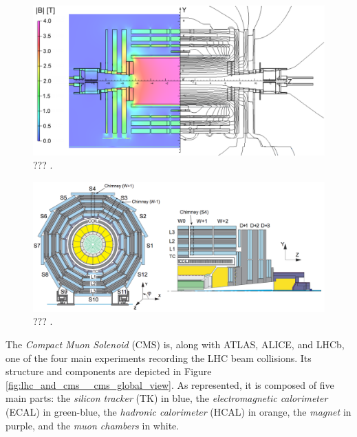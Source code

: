   \begin{figure}[h!]
    \centering
    \includegraphics[width=\textwidth]{img/I-3-cms/magnet.png}
    \caption{??? \cite{Chatrchyan:2009si}.}
    \label{fig:I-3-cms-magnet}
  \end{figure}

  \begin{figure}[h!]
    \centering
    \includegraphics[width=\textwidth]{img/I-3-cms/muon-numbering.png}
    \caption{??? \cite{Chatrchyan:2009si}.}
    \label{fig:I-3-cms-muon-numbering}
  \end{figure}
























\newcommand{\GeVc}{GeV c$ ^{-1} $}
\newcommand{\um}{$ \mu $m}
\newcommand{\us}{$ \mu $s}
\newcommand{\pT}{$ p_T $}
\newcommand{\pZ}{$ p_Z $}
\newcommand{\axis}[1]{#1}

		The \emph{Compact Muon Solenoid} (CMS) \Cite{CMS_at_LHC} is, along with ATLAS, ALICE, and LHCb, one of the four main experiments recording the LHC beam collisions. Its structure and components are depicted in Figure \ref{fig:lhc_and_cms__cms_global_view}. As represented, it is composed of five main parts: the \emph{silicon tracker} (TK) in blue, the \emph{electromagnetic calorimeter} (ECAL) in green-blue, the \emph{hadronic calorimeter} (HCAL) in orange, the \emph{magnet} in purple, and the \emph{muon chambers} in white. \\

